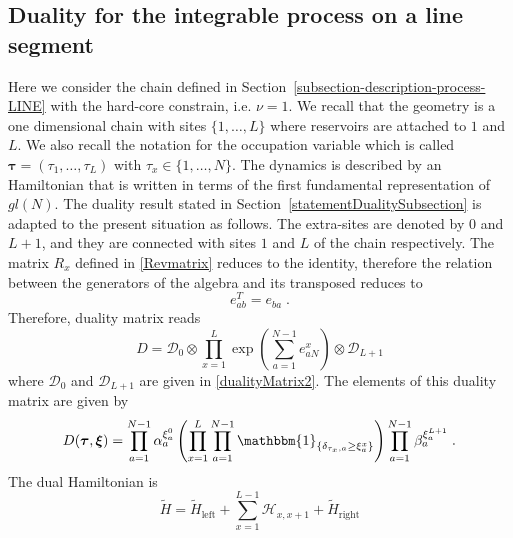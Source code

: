 \documentclass[10pt]{article}
\numberwithin{equation}{section}
\numberwithin{equation}{subsection}
\newcommand{\dt}{\;.}
\begin{document}
\subsection{Duality for the integrable process on a line segment}\label{integrableChain-duality}
Here we consider the chain defined in Section~\ref{subsection-description-process-LINE} with the hard-core constrain, i.e. $\nu=1$. 
We recall that the geometry is a one dimensional chain with sites $\{1,\ldots,L\}$ where reservoirs are attached to $1$ and $L$. 
We also recall the notation for the occupation variable which is called $\bm{\tau}=(\tau_1,\ldots,\tau_L)$ with $\tau_x\in\{1,\ldots,N\}$.
The dynamics is described by an Hamiltonian that is written in terms of the first fundamental representation of ${gl}(N)$. The duality result stated in Section~\ref{statementDualitySubsection} is adapted to the present situation as follows. 
The extra-sites are denoted by $0$ and $L+1$, and they are connected with sites $1$ and $L$ of the chain respectively. The matrix $R_{x}$ defined in \eqref{Revmatrix} 
reduces to the identity, therefore the relation between the generators of the algebra and its transposed reduces to
\begin{equation}\label{transpostionPropertyFund}
	e_{ab}^T= e_{ba}\dt
\end{equation}
Therefore, duality matrix reads
\begin{equation}
	D=\mathcal{D}_{0}\otimes\prod_{x=1}^{L}\exp{\left(\sum_{a=1}^{N-1}e_{aN}^{x}\right)}\otimes \mathcal{D}_{L+1}
\end{equation}
where $\mathcal{D}_{0}$ and $\mathcal{D}_{L+1}$ are given in \eqref{dualityMatrix2}. 
The elements of this duality matrix are given by
\begin{equation}\label{ElementsDualityMatrixChain_1}
	D(\bm{\tau},\bm{\xi})=\prod_{a=1}^{N-1}\alpha_{a}^{\xi_{a}^{0}}\left(\prod_{x=1}^{L}\prod_{a=1}^{N-1}\mathbbm{1}_{\{\delta_{\tau_{x},a}\geq \xi_{a}^{x}\}}\right)\prod_{a=1}^{N-1}\beta_{a}^{\xi_{a}^{L+1}}\dt
\end{equation}
The dual Hamiltonian is
\begin{equation}
	\widetilde{H}=\widetilde{H}_{\text{left}}+\sum_{x=1}^{L-1}\mathcal{H}_{x,x+1}+\widetilde{H}_{\text{right}}
\end{equation}
\end{document}
